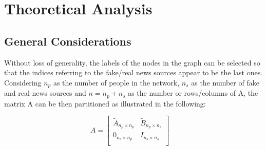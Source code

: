 \section{Theoretical Analysis}
\subsection{General Considerations}
Without loss of generality, the labels of the nodes in the graph can be selected so that the indices referring to the fake/real news sources appear to be the last ones. Considering $n_p$ as the number of people in the network, $n_s$ as the number of fake and real news sources and $n=n_p + n_s$ as the number or rows/columns of A, the matrix A can be then partitioned as illustrated in the following:

$$
A = 
\begin{bmatrix}
	\tilde{A}_{n_p \times n_p} & \tilde{B}_{n_p \times n_s} \\
	0_{n_s \times n_p} & I_{n_s \times n_s} \\
\end{bmatrix} 
\quad
$$

